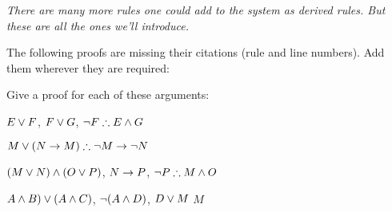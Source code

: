 \emph{There are many more rules one could add to the system as derived rules. But these are all the ones we'll introduce.}
\newpage
\begin{practiceproblems}
\solutions
\problempart
\label{pr.justifyTFLproof}
The following proofs are missing their citations (rule and line numbers). Add them wherever they are required:
\begin{multicols}{2}
\begin{pf}
 {}
 {}
\end{pf}
%
\vfill
%
\begin{pf}
\open
\close
\end{pf}
%
\columnbreak
%
\begin{pf}
\open
\close
{}
\open
\close
{}
\end{pf}
\end{multicols}

\problempart
Give a proof for each of these arguments:
\begin{earg}
\item $E\vee F$, $F\vee G$, $\enot F \therefore E \eand G$
\item $M\eor(N\eif M) \therefore \enot M \eif \enot N$
\item $(M \vee N) \mathbin{\wedge} (O \vee P)$, $N \rightarrow P$, $\enot P \therefore M\eand O$
\item $A\mathbin{\wedge} B)\vee(A\mathbin{\wedge} C)$, $\neg(A\mathbin{\wedge} D)$, $D\vee M$ \therefore $M$
\end{earg}



\end{practiceproblems}

